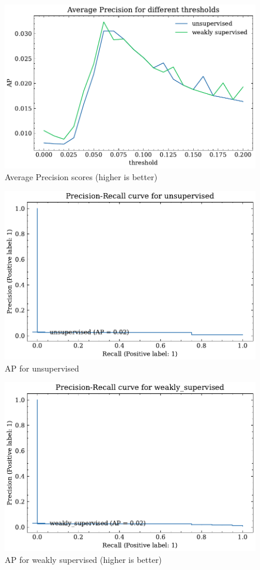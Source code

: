 \begin{figure}[h]
  \centering
  \includegraphics{5Results/figs/bsle/average_precision_score_for_thresholds.pdf}
  \caption{Average Precision scores (higher is better)}
\end{figure}
\begin{figure}[h]
  \centering
  \includegraphics{5Results/figs/bsle/pr_auc_unsupervised.pdf}
  \caption{AP for unsupervised}
\end{figure}
\begin{figure}[h]
  \centering
  \includegraphics{5Results/figs/bsle/pr_auc_weakly_supervised.pdf}
  \caption{AP for weakly supervised (higher is better)}
\end{figure}
